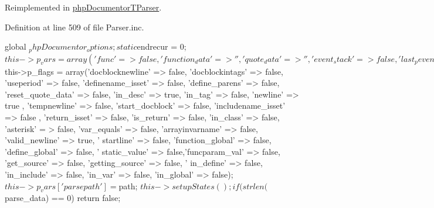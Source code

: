 \-Reimplemented in \hyperlink{classphp_documentor_t_parser_a20139dbf0050f44b70e34bf32d89d7e4}{php\-Documentor\-T\-Parser}.



\-Definition at line 509 of file \-Parser.\-inc.


\begin{DoxyCode}
    {
        global $_phpDocumentor_options;
        static $endrecur = 0;
        $this->p_vars = array('func' => false, 'function_data' => '', '
      quote_data' => '', 'event_stack' => false, 'last_pevent' => 0,
                        'two_words_ago' => '', 'temp_word' => '', 'docblock' =>
       false, 'line' => array(), 'linecount' => 0, 'startword' => '',
                        'periodline' => 0, 'shortdesc' => '', 'docblock_desc' =
      > '', 'class' => false, 'source_location' => '',
                        'define_params_data' => '', 'define' => false, '
      define_name' => '', 'define_value' => '', 'var' => false,
                        'oldtoken' => false, 'comment_data' => '', '
      function_param' => NULL, 'inline_dockeyword_type' => false,
                        'inline_dockeyword_data' => false, 'dockeyword_type' =>
       false, 'dockeyword_data' =>false, 'param_var' => false,
                        'include_name' => '', 'include_value' => '','include' =
      > false, 'return_type' => '', 'cur_class' => '', 'property_name' => false,
                        'function_data' => false, 'varname' => '', 'returntype'
       => false, 'vartype' => false, 'paramtype' => false,
                        'tagname' => '', 'find_global' => '', 'global_type' => 
      '', 'paramname' => false, 'statics' => array(),
                        'static_count' => 0, 'static_val' => array(), '
      docblock_type' => 'docblock', 'linenum' => false,
                        'seelement' => false);
    
        $this->p_flags = array('docblocknewline' => false, 'docblockintags' => 
      false, 'useperiod' => false,
                        'definename_isset' => false, 'define_parens' => false, 
      'reset_quote_data' => false,
                        'in_desc' => true, 'in_tag' => false, 'newline' => true
      , 'tempnewline' => false,
                        'start_docblock' => false, 'includename_isset' => false
      , 'return_isset' => false,
                        'is_return' => false, 'in_class' => false, 'asterisk' =
      > false, 'var_equals' => false,
                        'arrayinvarname' => false, 'valid_newline' => true, '
      startline' => false,
                        'function_global' => false, 'define_global' => false, '
      static_value' => false,'funcparam_val' => false,
                        'get_source' => false, 'getting_source' => false, '
      in_define' => false, 'in_include' => false,
                        'in_var' => false, 'in_global' => false);
        $this->p_vars['parsepath'] = $path;
        $this->setupStates();
        if (strlen($parse_data) == 0)
        {
            return false;
        }

}
\end{DoxyCode}
